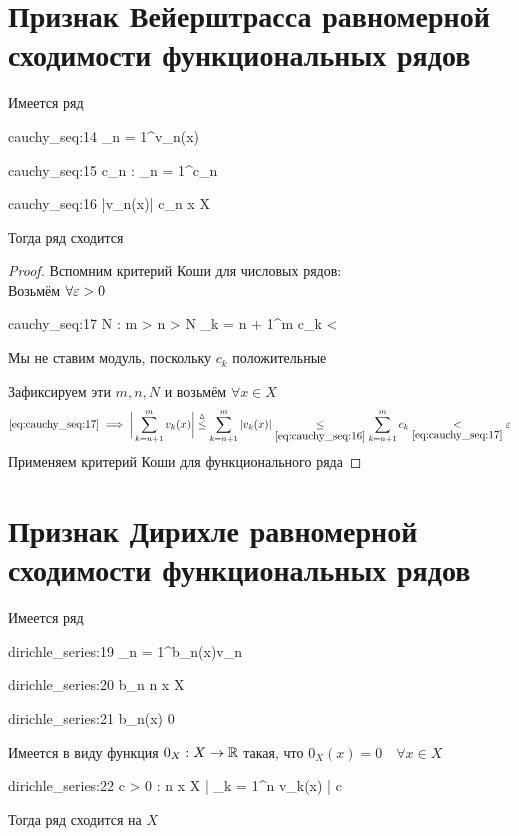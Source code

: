 \section{Признак Вейерштрасса равномерной сходимости функциональных рядов}

\begin{theorem}
	Имеется ряд
	\begin{equ}{cauchy_seq:14}
		\sum_{n = 1}^\infty v_n(x)
	\end{equ}
	\begin{equ}{cauchy_seq:15}
		\exist c_n : \quad \sum_{n = 1}^\infty c_n 
	\end{equ}
	\begin{equ}{cauchy_seq:16}
		|v_n(x)| \le c_n \quad \forall x \in X
	\end{equ}
	Тогда ряд  сходится 
\end{theorem}

\begin{proof}
	Вспомним критерий Коши для числовых рядов: \\
	Возьмём $ \forall \varepsilon > 0 $
	\begin{equ}{cauchy_seq:17}
		 \implies \exist N : \quad \forall m > n > N \quad \sum_{k = n + 1}^m c_k < \veps
	\end{equ}
	\begin{note}
		Мы не ставим модуль, поскольку $ c_k $ положительные
	\end{note}
	Зафиксируем эти $ m, n, N $ и возьмём $ \forall x \in X $
	$$ \eref{cauchy_seq:17} \implies \bigg| \sum_{k = n + 1}^m v_k(x) \bigg| \trile \sum_{k = n + 1}^m |v_k(x)|\underset{\eref{cauchy_seq:16}}\le \sum_{k = n + 1}^m c_k \underset{\eref{cauchy_seq:17}}< \veps $$
	Применяем критерий Коши для функционального ряда
\end{proof}

\section{Признак Дирихле равномерной сходимости функциональных рядов}

\begin{theorem}
	Имеется ряд
	\begin{equ}{dirichle_series:19}
		\sum_{n = 1}^\infty b_n(x)v_n
	\end{equ}
	\begin{equ}{dirichle_series:20}
		b_n  n \quad \forall {} x \in X
	\end{equ}
	\begin{equ}{dirichle_series:21}
		b_n(x)  0
	\end{equ}
	\begin{note}
		Имеется в виду функция $ 0_X : X \to \mathbb{R} $ такая, что $ 0_X(x) = 0 \quad \forall x \in X $
	\end{note}
	\begin{equ}{dirichle_series:22}
		\exist c > 0 : \quad \forall n \quad \forall x \in X \quad \bigg| \sum_{k = 1}^n v_k(x) \bigg| \le c
	\end{equ}
	Тогда ряд   сходится на $ X $
\end{theorem}

